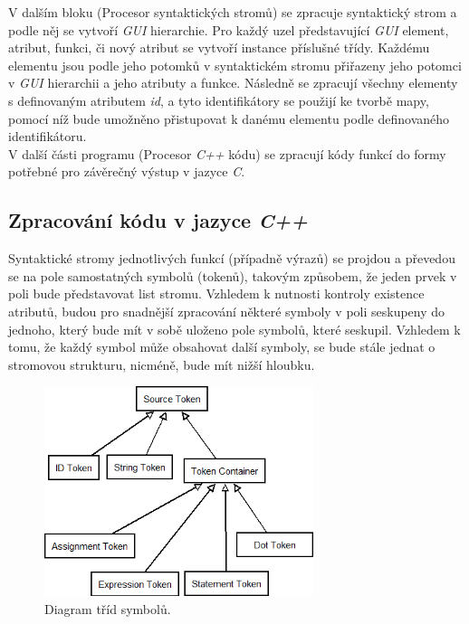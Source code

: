 \documentclass[11pt,twoside,a4paper]{book}
\begin{document}
V dalším bloku (Procesor syntaktických stromů) se zpracuje syntaktický strom a podle něj se vytvoří \textit{GUI} hierarchie. Pro každý uzel představující \textit{GUI} element, atribut, funkci, či nový atribut se vytvoří instance příslušné třídy. Každému elementu jsou podle jeho potomků v syntaktickém stromu přiřazeny jeho potomci v \textit{GUI} hierarchii a jeho atributy a funkce.
Následně se zpracují všechny elementy s definovaným atributem \textit{id}, a tyto identifikátory se použijí ke tvorbě mapy, pomocí níž bude umožněno přistupovat k danému elementu podle definovaného identifikátoru.\\
V další části programu (Procesor \textit{C++} kódu) se zpracují kódy funkcí do formy potřebné pro závěrečný výstup v jazyce \textit{C}.

\subsection{\label{SEC:tokens}Zpracování kódu v jazyce \textit{C++}}
Syntaktické stromy jednotlivých funkcí (případně výrazů) se projdou a převedou se na pole samostatných symbolů (tokenů), takovým způsobem, že jeden prvek v poli bude představovat list stromu. Vzhledem k nutnosti kontroly existence atributů, budou pro snadnější zpracování některé symboly v poli seskupeny do jednoho, který bude mít v sobě uloženo pole symbolů, které seskupil. Vzhledem k tomu, že každý symbol může obsahovat další symboly, se bude stále jednat o stromovou strukturu, nicméně, bude mít nižší hloubku.\\
\begin{figure}[!ht]
\begin{center}
  \includegraphics[width=0.7\textwidth]{tokens}
\caption{{\label{fig:fig2}}Diagram tříd symbolů.}
\end{center}
\end{figure}
\end{document}
